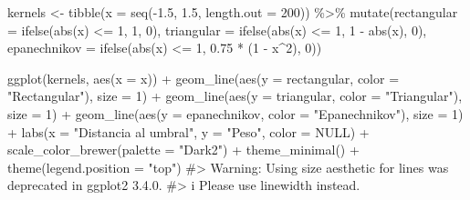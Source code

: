 \documentclass[
  letterpaper,
  DIV=11,
  numbers=noendperiod,
  oneside]{scrreprt}
\newenvironment{Shaded}{\begin{snugshade}}{\end{snugshade}}
\newcommand{\AttributeTok}[1]{\textcolor[rgb]{0.40,0.45,0.13}{#1}}
\newcommand{\CommentTok}[1]{\textcolor[rgb]{0.37,0.37,0.37}{#1}}
\newcommand{\ConstantTok}[1]{\textcolor[rgb]{0.56,0.35,0.01}{#1}}
\newcommand{\DecValTok}[1]{\textcolor[rgb]{0.68,0.00,0.00}{#1}}
\newcommand{\FloatTok}[1]{\textcolor[rgb]{0.68,0.00,0.00}{#1}}
\newcommand{\FunctionTok}[1]{\textcolor[rgb]{0.28,0.35,0.67}{#1}}
\newcommand{\NormalTok}[1]{\textcolor[rgb]{0.00,0.23,0.31}{#1}}
\newcommand{\OtherTok}[1]{\textcolor[rgb]{0.00,0.23,0.31}{#1}}
\newcommand{\SpecialCharTok}[1]{\textcolor[rgb]{0.37,0.37,0.37}{#1}}
\newcommand{\StringTok}[1]{\textcolor[rgb]{0.13,0.47,0.30}{#1}}
\begin{document}
\begin{Shaded}
\begin{Highlighting}[]
\NormalTok{kernels }\OtherTok{\textless{}{-}} \FunctionTok{tibble}\NormalTok{(}\AttributeTok{x =} \FunctionTok{seq}\NormalTok{(}\SpecialCharTok{{-}}\FloatTok{1.5}\NormalTok{, }\FloatTok{1.5}\NormalTok{, }\AttributeTok{length.out =} \DecValTok{200}\NormalTok{)) }\SpecialCharTok{\%\textgreater{}\%}
  \FunctionTok{mutate}\NormalTok{(}\AttributeTok{rectangular =} \FunctionTok{ifelse}\NormalTok{(}\FunctionTok{abs}\NormalTok{(x) }\SpecialCharTok{\textless{}=} \DecValTok{1}\NormalTok{, }\DecValTok{1}\NormalTok{, }\DecValTok{0}\NormalTok{),}
         \AttributeTok{triangular =} \FunctionTok{ifelse}\NormalTok{(}\FunctionTok{abs}\NormalTok{(x) }\SpecialCharTok{\textless{}=} \DecValTok{1}\NormalTok{, }\DecValTok{1} \SpecialCharTok{{-}} \FunctionTok{abs}\NormalTok{(x), }\DecValTok{0}\NormalTok{),}
         \AttributeTok{epanechnikov =} \FunctionTok{ifelse}\NormalTok{(}\FunctionTok{abs}\NormalTok{(x) }\SpecialCharTok{\textless{}=} \DecValTok{1}\NormalTok{, }\FloatTok{0.75} \SpecialCharTok{*}\NormalTok{ (}\DecValTok{1} \SpecialCharTok{{-}}\NormalTok{ x}\SpecialCharTok{\^{}}\DecValTok{2}\NormalTok{), }\DecValTok{0}\NormalTok{))}

\FunctionTok{ggplot}\NormalTok{(kernels, }\FunctionTok{aes}\NormalTok{(}\AttributeTok{x =}\NormalTok{ x)) }\SpecialCharTok{+}
  \FunctionTok{geom\_line}\NormalTok{(}\FunctionTok{aes}\NormalTok{(}\AttributeTok{y =}\NormalTok{ rectangular, }\AttributeTok{color =} \StringTok{"Rectangular"}\NormalTok{), }\AttributeTok{size =} \DecValTok{1}\NormalTok{) }\SpecialCharTok{+}
  \FunctionTok{geom\_line}\NormalTok{(}\FunctionTok{aes}\NormalTok{(}\AttributeTok{y =}\NormalTok{ triangular, }\AttributeTok{color =} \StringTok{"Triangular"}\NormalTok{), }\AttributeTok{size =} \DecValTok{1}\NormalTok{) }\SpecialCharTok{+}
  \FunctionTok{geom\_line}\NormalTok{(}\FunctionTok{aes}\NormalTok{(}\AttributeTok{y =}\NormalTok{ epanechnikov, }\AttributeTok{color =} \StringTok{"Epanechnikov"}\NormalTok{), }\AttributeTok{size =} \DecValTok{1}\NormalTok{) }\SpecialCharTok{+}
  \FunctionTok{labs}\NormalTok{(}\AttributeTok{x =} \StringTok{"Distancia al umbral"}\NormalTok{, }\AttributeTok{y =} \StringTok{"Peso"}\NormalTok{, }\AttributeTok{color =} \ConstantTok{NULL}\NormalTok{) }\SpecialCharTok{+}
  \FunctionTok{scale\_color\_brewer}\NormalTok{(}\AttributeTok{palette =} \StringTok{"Dark2"}\NormalTok{) }\SpecialCharTok{+}
  \FunctionTok{theme\_minimal}\NormalTok{() }\SpecialCharTok{+}
  \FunctionTok{theme}\NormalTok{(}\AttributeTok{legend.position =} \StringTok{"top"}\NormalTok{)}
\CommentTok{\#\textgreater{} Warning: Using \textasciigrave{}size\textasciigrave{} aesthetic for lines was deprecated in ggplot2 3.4.0.}
\CommentTok{\#\textgreater{} i Please use \textasciigrave{}linewidth\textasciigrave{} instead.}
\end{Highlighting}
\end{Shaded}
\end{document}
